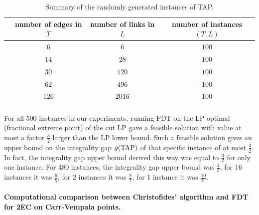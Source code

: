 \begin{table}[h!]
	\begin{small}
		\centering
		\begin{tabular}{c c c c}
			\hline
			& number of edges in $T$ & number of links in $L$ & number of instances $(T,L)$\\ \hline
			 & $6$ & $6$ & $100$ \\ 
			 & $14$ & $28$ & $100$ \\ 
			 & $30$ & $120$ & $100$ \\
			 & $62$ & $496$ & $100$ \\ 
			  & $126$ & $2016$ & $100$ \\  \hline \\
		\end{tabular}\caption{Summary of the randomly generated instances of TAP.} \label{tableTAP}
	\end{small}
\end{table}
For all 500 instances in our experiments, running FDT on the LP optimal (fractional extreme point) of the cut LP gave a feasible solution with value at most a factor $\frac{3}{2}$ larger than the LP lower bound.  Such a feasible solution gives an upper bound on the integrality gap $g(\operatorname{{{TAP}}})$ of that specific instance of at most $\frac{3}{2}$.
In fact, the integrality gap upper bound derived this way was equal to $\frac{3}{2}$ for only one instance.
For 480 instances, the integrality gap upper bound was $\frac{4}{3}$, for 16 instances it was $\frac{6}{5}$, for 2 instances it was $\frac{8}{7}$, for 1 instance it was $\frac{10}{9}$. 
\paragraph{Computational comparison between Christofides' algorithm and FDT for 2EC on Carr-Vempala points.} 

